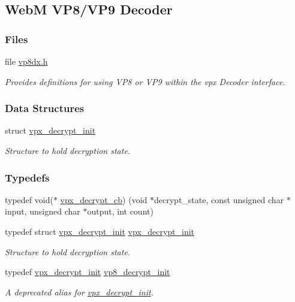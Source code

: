\hypertarget{group__vp8__decoder}{}\subsection{WebM V\+P8/\+V\+P9 Decoder}
\label{group__vp8__decoder}
\subsubsection*{Files}
\begin{DoxyCompactItemize}
\item 
file \hyperlink{vp8dx_8h}{vp8dx.\+h}
\begin{DoxyCompactList}\small\item\em Provides definitions for using V\+P8 or V\+P9 within the vpx Decoder interface. \end{DoxyCompactList}\end{DoxyCompactItemize}
\subsubsection*{Data Structures}
\begin{DoxyCompactItemize}
\item 
struct \hyperlink{structvpx__decrypt__init}{vpx\+\_\+decrypt\+\_\+init}
\begin{DoxyCompactList}\small\item\em Structure to hold decryption state. \end{DoxyCompactList}\end{DoxyCompactItemize}
\subsubsection*{Typedefs}
\begin{DoxyCompactItemize}
\item 
typedef void($\ast$ \hyperlink{group__vp8__decoder_ga10cdcbbc04aa831558688f4a4149fcbd}{vpx\+\_\+decrypt\+\_\+cb}) (void $\ast$decrypt\+\_\+state, const unsigned char $\ast$input, unsigned char $\ast$output, int count)
\item 
typedef struct \hyperlink{structvpx__decrypt__init}{vpx\+\_\+decrypt\+\_\+init} \hyperlink{group__vp8__decoder_gaa55171d8fa453260b1375dba87524b6a}{vpx\+\_\+decrypt\+\_\+init}
\begin{DoxyCompactList}\small\item\em Structure to hold decryption state. \end{DoxyCompactList}\item 
typedef \hyperlink{structvpx__decrypt__init}{vpx\+\_\+decrypt\+\_\+init} \hyperlink{group__vp8__decoder_gafda00b2721f7bfb804a1308d61f2a32f}{vp8\+\_\+decrypt\+\_\+init}\hypertarget{group__vp8__decoder_gafda00b2721f7bfb804a1308d61f2a32f}{}\label{group__vp8__decoder_gafda00b2721f7bfb804a1308d61f2a32f}

\begin{DoxyCompactList}\small\item\em A deprecated alias for \hyperlink{structvpx__decrypt__init}{vpx\+\_\+decrypt\+\_\+init}. \end{DoxyCompactList}\end{DoxyCompactItemize}
